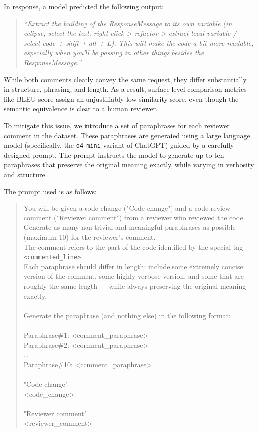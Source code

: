 In response, a model predicted the following output:

\begin{quote}
	\textit{“Extract the building of the ResponseMessage to its own variable (in eclipse, select the
		text, right-click > refactor > extract local variable / select code + shift + alt + L). This
		will make the code a bit more readable, especially when you’ll be passing in other things besides
		the ResponseMessage.”}
\end{quote}

While both comments clearly convey the same request, they differ substantially in structure,
phrasing, and length. As a result, surface-level comparison metrics like BLEU score assign an
unjustifiably low similarity score, even though the semantic equivalence is clear to a human
reviewer.

To mitigate this issue, we introduce a set of paraphrases for each reviewer comment in the dataset.
These paraphrases are generated using a large language model (specifically, the \texttt{o4-mini}
variant of ChatGPT) guided by a carefully designed prompt. The prompt instructs the model to
generate up to ten paraphrases that preserve the original meaning exactly, while varying in
verbosity and structure.

The prompt used is as follows:

\begin{quote}\ttfamily
	You will be given a code change ("Code change") and a code review comment ("Reviewer comment")
	from a reviewer who reviewed the code.\\
	Generate as many non-trivial and meaningful paraphrases as possible (maximum 10) for the
	reviewer's comment.\\
	The comment refers to the part of the code identified by the special tag
	\texttt{<commented\_line>}.\\
	Each paraphrase should differ in length: include some extremely concise version of the comment,
	some highly verbose version, and some that are roughly the same length — while always preserving
	the original meaning exactly.\\
	\\
	Generate the paraphrase (and nothing else) in the following format:\\
	\\
	Paraphrase\#1: \textless comment\_paraphrase\textgreater\\
	Paraphrase\#2: \textless comment\_paraphrase\textgreater\\
	\ldots\\
	Paraphrase\#10: \textless comment\_paraphrase\textgreater\\
	\\
	"Code change"\\
	\textless code\_change\textgreater\\
	\\
	"Reviewer comment"\\
	\textless reviewer\_comment\textgreater
\end{quote}

